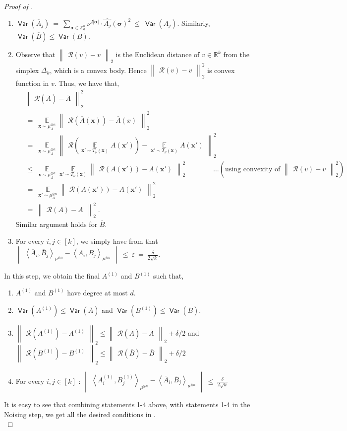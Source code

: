 \documentclass[11pt]{article}
\newcommand{\inparen}[1]{\left ( #1 \right )}
\newcommand{\inangle}[1]{\left \langle #1 \right \rangle}
\newcommand{\inabs}[1]{\begin{vmatrix} #1 \end{vmatrix}}
\newcommand{\norm}[2]{\begin{Vmatrix} #2 \end{Vmatrix}_{#1}}
\DeclareMathOperator*{\Ex}{\mathbb{E}}
\DeclareMathOperator*{\Var}{\mathsf{Var}}
\newcommand{\what}[1]{\widehat{#1}}
\newcommand{\eps}{\varepsilon}
\newcommand{\bbR}{{\mathbb R}}
\newcommand{\bbZ}{{\mathbb Z}}
\newcommand{\bx}{{\bm x}}
\newcommand{\bsigma}{{\boldsymbol \sigma}}
\newcommand{\calR}{\mathcal{R}}
\begin{document}
\begin{proof}[Proof of ]
\begin{enumerate}
		\item $\Var(\overline{A}_j) ~=~ \sum\limits_{\bsigma \in \bbZ_q^n} \nu^{2|\bsigma|} \cdot \what{A_j}(\bsigma)^2 ~\le~ \Var(A_j)$. Similarly, $\Var(\overline{B}) \le \Var(B)$.
		
		\item Observe that $\norm{2}{\calR(v) - v}$ is the Euclidean distance of $v \in \bbR^k$ from the simplex $\Delta_k$, which is a convex body. Hence $\norm{2}{\calR(v) - v}^2$ is convex function in $v$. Thus, we have that,
		\begin{align*}
		& \norm{2}{\calR(\overline{A}) - \overline{A}}^2\\
		&~=~\Ex\limits_{\bx \sim \mu_A^{\otimes n}} \norm{2}{\calR(\overline{A}(\bx)) - \overline{A}(x)}^2\\
		&~=~ \Ex\limits_{\bx \sim \mu_A^{\otimes n}} \norm{2}{\calR\inparen{\Ex\limits_{\bx' \sim T_\nu(\bx)} A(\bx')} - \Ex\limits_{\bx' \sim T_\nu(\bx)} A(\bx')}^2\\
		&~\le~ \Ex\limits_{\bx \sim \mu_A^{\otimes n}} \Ex\limits_{\bx' \sim T_\nu(\bx)} \norm{2}{\calR\inparen{A(\bx')} - A(\bx')}^2 \qquad \qquad \ldots(\text{using convexity of } \norm{2}{\calR(v) - v}^2)\\
		&~=~ \Ex\limits_{\bx' \sim \mu_A^{\otimes n}} \norm{2}{\calR\inparen{A(\bx')} - A(\bx')}^2\\
		&~=~ \norm{2}{\calR(A) - A}^2\;.
		\end{align*}
		Similar argument holds for $\overline{B}$.
		
		\item For every $i, j \in [k]$, we simply have from  that
		$\inabs{\inangle{\overline{A}_i, \overline{B}_j}_{\mu^{\otimes n}} - \inangle{A_i, B_j}_{\mu^{\otimes n}}} ~\le~ \eps ~=~ \frac{\delta}{2 \sqrt{k}}$.
	\end{enumerate}
	
	 In this step, we obtain the final $A^{(1)}$ and $B^{(1)}$ such that,
	\begin{enumerate}
		\item $A^{(1)}$ and $B^{(1)}$ have degree at most $d$.
		\item $\Var(A^{(1)}) \le \Var(\overline{A})$ and $\Var(B^{(1)}) \le \Var(\overline{B})$.
		\item $\norm{2}{\calR(A^{(1)}) - A^{(1)}} \le \norm{2}{\calR(\overline{A}) - \overline{A}} + \delta/2$ and $\norm{2}{\calR(B^{(1)}) - B^{(1)}} \le \norm{2}{\calR(\overline{B}) - \overline{B}} + \delta/2$
		\item For every $i, j \in [k]$ : $\inabs{\inangle{A^{(1)}_i, B^{(1)}_j}_{\mu^{\otimes n}} - \inangle{\overline{A}_i, \overline{B}_j}_{\mu^{\otimes n}}} ~\le~ \frac{\delta}{2 \sqrt{k}}$
	\end{enumerate}
	It is easy to see that combining statements 1-4 above, with statements 1-4 in the Noising step, we get all the desired conditions in .\\
	

\end{proof}
\end{document}
